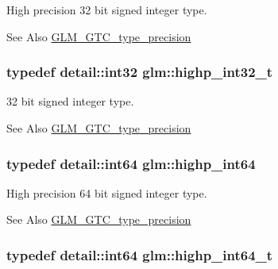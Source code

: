 High precision 32 bit signed integer type. \begin{DoxySeeAlso}{See Also}
\hyperlink{group__gtc__type__precision}{G\-L\-M\-\_\-\-G\-T\-C\-\_\-type\-\_\-precision} 
\end{DoxySeeAlso}
\hypertarget{group__gtc__type__precision_ga783d077a513c1f475f6cdb406b4238c3}{
\subsubsection[{highp\-\_\-int32\-\_\-t}]{\setlength{\rightskip}{0pt plus 5cm}typedef detail\-::int32 {\bf glm\-::highp\-\_\-int32\-\_\-t}}}\label{group__gtc__type__precision_ga783d077a513c1f475f6cdb406b4238c3}
32 bit signed integer type. \begin{DoxySeeAlso}{See Also}
\hyperlink{group__gtc__type__precision}{G\-L\-M\-\_\-\-G\-T\-C\-\_\-type\-\_\-precision} 
\end{DoxySeeAlso}
\hypertarget{group__gtc__type__precision_ga7ffb27943e9569800979081bc548621c}{
\subsubsection[{highp\-\_\-int64}]{\setlength{\rightskip}{0pt plus 5cm}typedef detail\-::int64 {\bf glm\-::highp\-\_\-int64}}}\label{group__gtc__type__precision_ga7ffb27943e9569800979081bc548621c}
High precision 64 bit signed integer type. \begin{DoxySeeAlso}{See Also}
\hyperlink{group__gtc__type__precision}{G\-L\-M\-\_\-\-G\-T\-C\-\_\-type\-\_\-precision} 
\end{DoxySeeAlso}
\hypertarget{group__gtc__type__precision_ga0f5186bde44471133b08057cae8a51ac}{
\subsubsection[{highp\-\_\-int64\-\_\-t}]{\setlength{\rightskip}{0pt plus 5cm}typedef detail\-::int64 {\bf glm\-::highp\-\_\-int64\-\_\-t}}}\label{group__gtc__type__precision_ga0f5186bde44471133b08057cae8a51ac}
